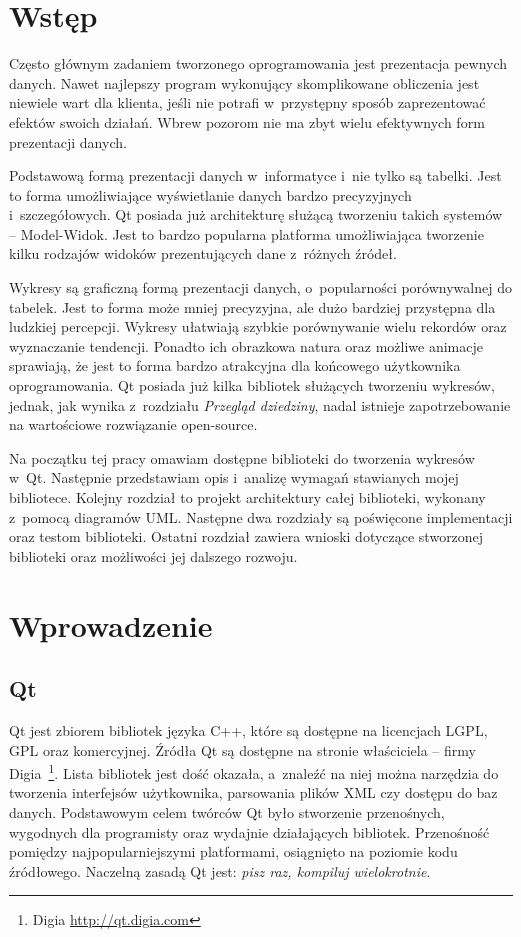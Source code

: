 \chapter*{Wstęp}
Często głównym zadaniem tworzonego oprogramowania jest prezentacja pewnych danych. Nawet najlepszy program wykonujący skomplikowane obliczenia jest niewiele wart dla klienta, jeśli nie potrafi w~przystępny sposób zaprezentować efektów swoich działań. Wbrew pozorom nie ma zbyt wielu efektywnych form prezentacji danych.
 
Podstawową formą prezentacji danych w~informatyce i~nie tylko są tabelki. Jest to forma umożliwiające wyświetlanie danych bardzo precyzyjnych i~szczegółowych. Qt posiada już architekturę służącą tworzeniu takich systemów -- Model-Widok. Jest to bardzo popularna platforma umożliwiająca tworzenie kilku rodzajów widoków prezentujących dane z~różnych źródeł.

Wykresy są graficzną formą prezentacji danych, o~popularności porównywalnej do tabelek. Jest to forma może mniej precyzyjna, ale dużo bardziej przystępna dla ludzkiej percepcji. Wykresy ułatwiają szybkie porównywanie wielu rekordów oraz wyznaczanie tendencji. Ponadto ich obrazkowa natura oraz możliwe animacje sprawiają, że jest to forma bardzo atrakcyjna dla końcowego użytkownika oprogramowania.
Qt posiada już kilka bibliotek służących tworzeniu wykresów, jednak, jak wynika z~rozdziału \textit{Przegląd dziedziny}, nadal istnieje zapotrzebowanie na wartościowe rozwiązanie open-source.

Na początku tej pracy omawiam dostępne biblioteki do tworzenia wykresów w~Qt. Następnie przedstawiam opis i~analizę wymagań stawianych mojej bibliotece. Kolejny rozdział to projekt architektury całej biblioteki, wykonany z~pomocą diagramów UML. Następne dwa rozdziały są poświęcone implementacji oraz testom biblioteki. Ostatni rozdział zawiera wnioski dotyczące stworzonej biblioteki oraz możliwości jej dalszego rozwoju. 

\chapter{Wprowadzenie}
\section{Qt}
Qt jest zbiorem bibliotek języka C++, które są dostępne na licencjach LGPL, GPL oraz komercyjnej. Źródła Qt są dostępne na stronie właściciela -- firmy Digia~\footnote{Digia \url{http://qt.digia.com}}. Lista bibliotek jest dość okazała, a~znaleźć na niej można narzędzia do tworzenia interfejsów użytkownika, parsowania plików XML czy dostępu do baz danych. Podstawowym celem twórców Qt było stworzenie przenośnych, wygodnych dla programisty oraz wydajnie działających bibliotek. Przenośność pomiędzy najpopularniejszymi platformami, osiągnięto na poziomie kodu źródłowego. Naczelną zasadą Qt jest: \textit{pisz raz, kompiluj wielokrotnie}. 

